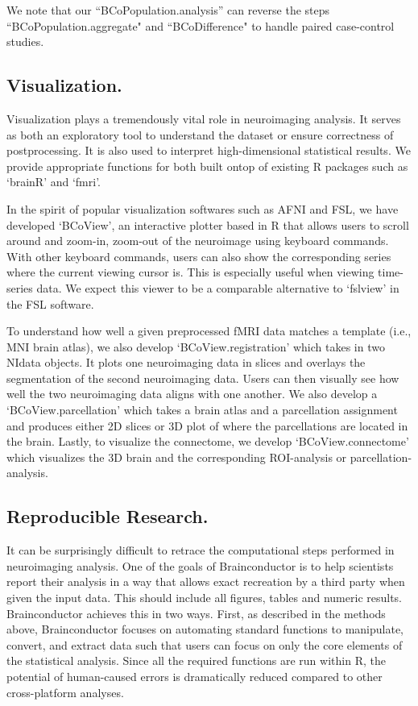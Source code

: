 \documentclass{nature}
\begin{document}
We note that our ``BCoPopulation.analysis'' can reverse the steps
``BCoPopulation.aggregate"
and ``BCoDifference" to handle paired case-control studies.

\subsection{Visualization.}
Visualization plays a tremendously vital role in neuroimaging analysis.
It serves as both an exploratory tool to understand the dataset or ensure
correctness
of postprocessing. It is also used to interpret high-dimensional statistical
results.
We provide appropriate functions for both built ontop of existing R packages
such
as `brainR' and `fmri'.

In the spirit of popular visualization softwares such as AFNI and FSL, we have
developed `BCoView', an interactive plotter based in R that allows users to
scroll around and
zoom-in, zoom-out of the neuroimage using keyboard commands. With other keyboard
commands, users can also show the corresponding series where the current
viewing
cursor is. This is especially useful when viewing time-series data. 
We expect this viewer to be a comparable alternative to `fslview' in
the FSL
software.

To understand how well a given preprocessed fMRI data matches a template (i.e.,
MNI brain
atlas), we also develop `BCoView.registration' which takes in two NIdata
objects.
It plots one neuroimaging data in slices and overlays the segmentation of the
second
neuroimaging data. Users can then visually see how well the two neuroimaging
data aligns
with one another. We also develop a `BCoView.parcellation' which takes a brain
atlas and
a parcellation assignment and produces either 2D slices or 3D plot of where the
parcellations
are located in the brain.
Lastly, to visualize the connectome, we develop `BCoView.connectome' which
visualizes the
3D brain and the corresponding ROI-analysis or parcellation-analysis.


\subsection{Reproducible Research.}

It can be surprisingly difficult to retrace the computational steps performed
in neuroimaging analysis. One of the goals of Brainconductor is to help
scientists report their analysis in a way that allows exact recreation by
a third party when given the input data. This should include all figures,
tables and numeric results. Brainconductor achieves this in two ways.
First, as described in the methods above, Brainconductor focuses on automating
standard functions to manipulate, convert, and extract data such that users
can focus on only the core elements of the statistical analysis. Since all the
required functions are run within R, the potential of human-caused errors is
dramatically reduced compared to other cross-platform analyses.
\end{document}
